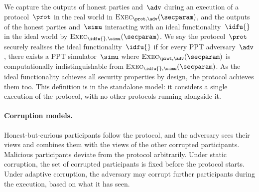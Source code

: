 We capture the outputs of honest parties and~$\adv$ during an execution of a
protocol~$\prot$ in the real world in
$\textsc{Exec}_{\prot,\adv}(\secparam)$, and the outputs of the honest
parties and~$\simu$ interacting with an ideal functionality~$\idfu{}$ in the
ideal world by $\textsc{Exec}_{\idfu{},\simu}(\secparam)$. We say the
protocol~$\prot$ securely realises the ideal functionality~$\idfu{}$ if for every
PPT adversary~$\adv$, there exists a PPT simulator~$\simu$ where
$\textsc{Exec}_{\prot,\adv}(\secparam)$ is computationally indistinguishable from
$\textsc{Exec}_{\idfu{},\simu}(\secparam)$. As the ideal functionality achieves
all security properties by design, the protocol achieves them too. This definition is in the standalone model: it considers a single
execution of the protocol, with no other protocols running alongside it.

\paragraph{Corruption models.} Honest-but-curious participants follow the protocol, and the adversary sees
their views and combines them with the views of the other corrupted
participants. Malicious participants deviate from the protocol arbitrarily.
Under static corruption, the set of corrupted participants is fixed before the
protocol starts. Under adaptive corruption, the adversary may corrupt further
participants during the execution, based on what it has seen.








